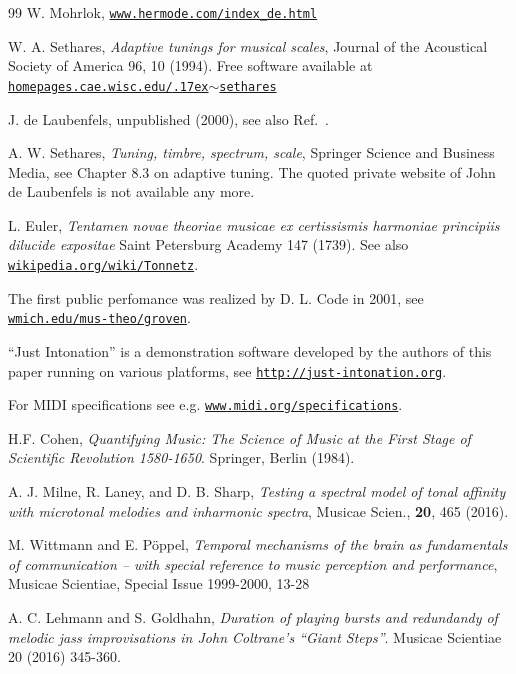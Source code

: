 \documentclass[a4paper,11pt]{iopart}
\begin{document}
\begin{thebibliography}{99}
W. Mohrlok, \href{http://www.hermode.com/index_de.html}{\tt www.hermode.com/index\_de.html}

W. A. Sethares,\textit{ Adaptive tunings for musical scales}, Journal of the Acoustical Society of America 96, 10 (1994). Free software available at \href{http://homepages.cae.wisc.edu/~sethares/software/TFSdocs/index.html}{\tt homepages.cae.wisc.edu/{\raise.17ex\hbox{$\scriptstyle\sim$}}sethares}

J. de Laubenfels, unpublished (2000), see also Ref.~\cite{Sethares2005}.

A. W. Sethares, \textit{Tuning, timbre, spectrum, scale}, Springer Science and Business Media, see Chapter 8.3 on adaptive tuning. The quoted private website of John de Laubenfels is not available any more.

L. Euler, \textit{Tentamen novae theoriae musicae ex certissismis harmoniae principiis dilucide expositae} Saint Petersburg Academy 147 (1739). See also \href{https://en.wikipedia.org/wiki/Tonnetz}{\tt wikipedia.org/wiki/Tonnetz}.

The first public perfomance was realized by D. L. Code in 2001, see \href{http://wmich.edu/mus-theo/groven/konsert.html}{\tt wmich.edu/mus-theo/groven}.

``Just Intonation'' is a demonstration software developed by the authors of this paper running on various platforms, see \href{http://just-intonation.org}{\tt http://just-intonation.org}. 

For MIDI specifications see e.g. \href{http://www.midi.org/specifications}{\tt www.midi.org/specifications}.

H.F. Cohen, \textit{Quantifying Music: The Science of Music at the First Stage of Scientific Revolution 1580-1650}. Springer, Berlin (1984).

A. J. Milne, R. Laney, and D. B. Sharp, 
\textit{Testing a spectral model of tonal affinity with microtonal melodies and inharmonic spectra}, Musicae Scien., \textbf{20}, 465 (2016).

M. Wittmann and E. P\"oppel, \textit{Temporal mechanisms of the brain as fundamentals of communication -- with special reference to music perception and performance}, Musicae Scientiae, Special Issue 1999-2000, 13-28

A. C. Lehmann and S. Goldhahn, \textit{Duration of playing bursts and redundandy of melodic jass improvisations in John Coltrane's ``Giant Steps''}. Musicae Scientiae 20 (2016) 345-360.


\end{thebibliography}
\end{document}
